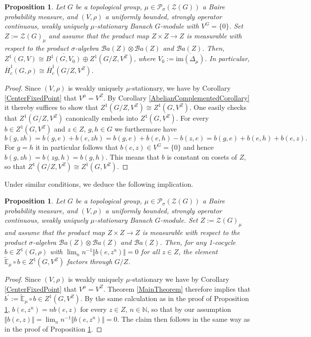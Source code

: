 \documentclass[a4paper,11pt,reqno]{amsart}
\numberwithin{equation}{section}
\newtheorem{proposition}[theorem]{Proposition}
\theoremstyle{definition}
\theoremstyle{remark}
\theoremstyle{remark}
\begin{document}
\begin{proposition} \label{CenterProposition} Let $G$ be a topological group, $\mu\in\mathcal{P}_{\sigma}(\mathcal{Z}(G))$ a Baire probability measure, and $(V,\rho)$ a uniformly bounded, strongly operator continuous, weakly uniquely $\mu$-stationary Banach $G$-module with $V^{G}=\{0\}$. Set $Z:=\mathcal{Z}(G)_{\mu}$ and assume that the product map $Z\times Z\rightarrow Z$ is measurable with respect to the product $\sigma$-algebra $\mathcal{B}a(Z)\otimes\mathcal{B}a(Z)$ and $\mathcal{B}a(Z)$. Then, $Z^{1}(G,V)\cong\overline{B^{1}(G,V_{0})}\oplus Z^{1}(G/Z,V^{Z})$, where \emph{$V_{0}:=\overline{\text{im}(\Delta_{\mu})}$}. In particular, $\overline{H}_{c}^{1}(G,\rho)\cong\overline{H}_{c}^{1}(G/Z,V^{Z})$. \end{proposition}

\begin{proof} Since $(V,\rho)$ is weakly uniquely $\mu$-stationary, we have by Corollary \ref{CenterFixedPoint} that $V^{\mu}=V^{Z}$. By Corollary \ref{AbelianComplementedCorollary} it thereby suffices to show that $Z^{1}(G/Z,V^{Z})\cong Z^{1}(G,V^{Z})$. One easily checks that $Z^{1}(G/Z,V^{Z})$ canonically embeds into $Z^{1}(G,V^{Z})$. For every $b\in Z^{1}(G,V^{Z})$ and $z\in Z$, $g,h\in G$ we furthermore have 
\[
b(g,zh)=b(g,e)+b(e,zh)=b(g,e)+b(e,h)-b(z,e)=b(g,e)+b(e,h)+b(e,z).
\]
For $g=h$ it in particular follows that $b(e,z)\in V^{G}=\{0\}$ and hence $b(g,zh)=b(zg,h)=b(g,h)$. This means that $b$ is constant on cosets of $Z$, so that $Z^{1}(G/Z,V^{Z})\cong Z^{1}(G,V^{Z})$. \end{proof}

Under similar conditions, we deduce the following implication.

\begin{proposition} \label{LimitBehaviour} Let $G$ be a topological group, $\mu\in\mathcal{P}_{\sigma}(\mathcal{Z}(G))$ a Baire probability measure, and $(V,\rho)$ a uniformly bounded, strongly operator continuous, weakly uniquely $\mu$-stationary Banach $G$-module. Set $Z:=\mathcal{Z}(G)_{\mu}$ and assume that the product map $Z\times Z\rightarrow Z$ is measurable with respect to the product $\sigma$-algebra $\mathcal{B}a(Z)\otimes\mathcal{B}a(Z)$ and $\mathcal{B}a(Z)$. Then, for any 1-cocycle $b\in Z^{1}(G,\rho)$ with $\lim_{n}n^{-1}\Vert b(e,z^{n})\Vert=0$ for all $z\in Z$, the element $\widetilde{\mathbb{E}}_{\mu}\circ b\in Z^{1}(G,V^{Z})$ factors through $G/Z$. \end{proposition}

\begin{proof} Since $(V,\rho)$ is weakly uniquely $\mu$-stationary we have by Corollary \ref{CenterFixedPoint} that $V^{\mu}=V^{Z}$. Theorem \ref{MainTheorem} therefore implies that $b^{\prime}:=\widetilde{\mathbb{E}}_{\mu}\circ b\in Z^{1}(G,V^{Z})$. By the same calculation as in the proof of Proposition \ref{CenterProposition}, $b(e,z^{n})=nb(e,z)$ for every $z\in Z$, $n\in\mathbb{N}$, so that by our assumption $\Vert b(e,z)\Vert=\lim_{n}n^{-1}\Vert b(e,z^{n})\Vert=0$. The claim then follows in the same way as in the proof of Proposition \ref{CenterProposition}. \end{proof}
\end{document}
